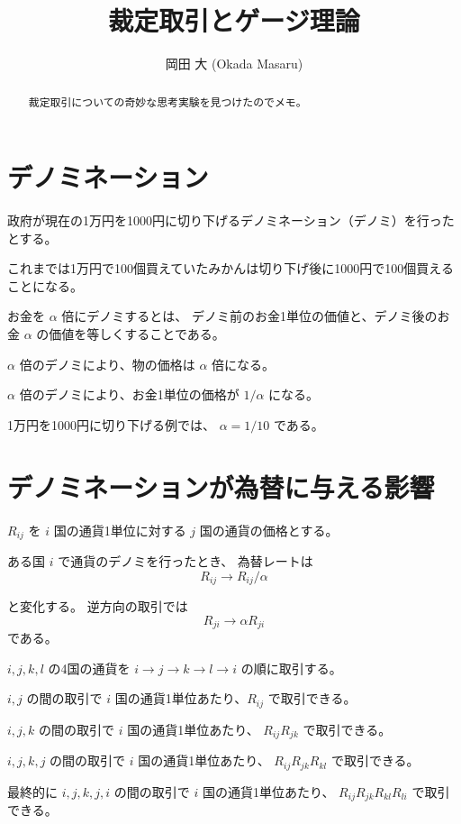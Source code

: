 \documentclass[uplatex]{jsarticle}
\title{
裁定取引とゲージ理論
}
\author{
岡田 大 (Okada Masaru)
}
\begin{document}
\maketitle

\begin{abstract}
	裁定取引についての奇妙な思考実験を見つけたのでメモ。
\end{abstract}




\section{デノミネーション}

政府が現在の1万円を1000円に切り下げるデノミネーション（デノミ）を行ったとする。

これまでは1万円で100個買えていたみかんは切り下げ後に1000円で100個買えることになる。

お金を $\alpha$ 倍にデノミするとは、
デノミ前のお金1単位の価値と、デノミ後のお金 $\alpha$ の価値を等しくすることである。

$\alpha$ 倍のデノミにより、物の価格は $\alpha$ 倍になる。

$\alpha$ 倍のデノミにより、お金1単位の価格が $1/\alpha$ になる。

1万円を1000円に切り下げる例では、 $\alpha=1/10$ である。




\section{デノミネーションが為替に与える影響}

$R_{ij}$ を $i$ 国の通貨1単位に対する $j$ 国の通貨の価格とする。

ある国 $i$ で通貨のデノミを行ったとき、
為替レートは
$$
	R_{ij} \to R_{ij} / \alpha
$$

と変化する。
逆方向の取引では
$$
	R_{ji} \to \alpha R_{ji}
$$
である。

$i,j,k,l$ の4国の通貨を
$i \to j \to k \to l \to i$
の順に取引する。

$i,j$ の間の取引で $i$ 国の通貨1単位あたり、$R_{ij}$
で取引できる。

$i,j,k$ の間の取引で $i$ 国の通貨1単位あたり、
$R_{ij} R_{jk}$
で取引できる。

$i,j,k,j$ の間の取引で $i$ 国の通貨1単位あたり、
$R_{ij} R_{jk} R_{kl}$
で取引できる。

最終的に
$i,j,k,j,i$ の間の取引で $i$ 国の通貨1単位あたり、
$R_{ij} R_{jk} R_{kl} R_{li}$
で取引できる。
\end{document}

